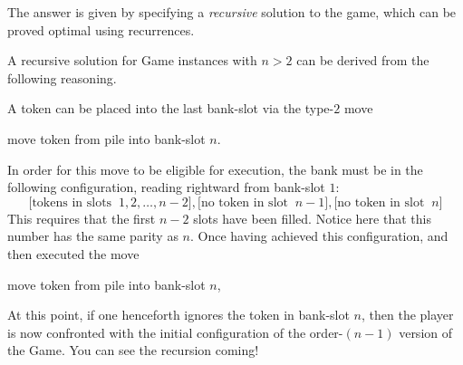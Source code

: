 The answer is given by specifying a {\em recursive} solution to
the game, which can be proved optimal using recurrences.


\bigskip

A recursive solution for Game instances with $n > 2$ can be derived
from the following reasoning.

A token can be placed into the last bank-slot via the type-$2$ move
\begin{center}
{\sc move token from pile into bank-slot} $n$.
\end{center}
In order for this move to be eligible for execution, the bank must be
in the following configuration, reading rightward from bank-slot $1$:
\[ \big[ \mbox{tokens in slots } \ 1, 2, \ldots, n-2 \big],
 \big[ \mbox{no token in slot } \ n-1 \big],
 \big[ \mbox{no token in slot } \ n \big]
\]
This requires that the first $n-2$ slots have been filled.
Notice here that this number has the same parity as $n$.
Once  having achieved this configuration, and then executed the move
\begin{center}
{\sc move token from pile into bank-slot} $n$,
\end{center}
At this point, if one
henceforth ignores the token in bank-slot $n$, then the player is now
confronted with the initial configuration of the order-$(n-1)$ version
of the Game.  You can see the recursion coming!

